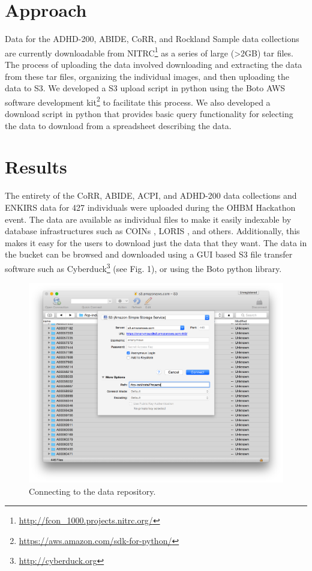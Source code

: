 \documentclass[twocolumn]{bmcart}%
\begin{document}
\section{Approach}\label{approach}

Data for the ADHD-200, ABIDE, CoRR, and Rockland Sample data collections
are currently downloadable from
NITRC\footnote{\url{http://fcon_1000.projects.nitrc.org/}} as a series
of large (\textgreater{}2GB) tar files. The process of uploading the
data involved downloading and extracting the data from these tar files,
organizing the individual images, and then uploading the data to S3. We
developed a S3 upload script in python using the Boto AWS software
development kit\footnote{\url{https://aws.amazon.com/sdk-for-python/}}
to facilitate this process. We also developed a download script in
python that provides basic query functionality for selecting the data to
download from a spreadsheet describing the data.

\section{Results}\label{results}

The entirety of the CoRR, ABIDE, ACPI, and ADHD-200 data collections and
ENKIRS data for 427 individuals were uploaded during the OHBM Hackathon
event. The data are available as individual files to make it easily
indexable by database infrastructures such as COINs \cite{landis2016},
LORIS \cite{Das2011}, and others. Additionally, this makes it easy for
the users to download just the data that they want. The data in the
bucket can be browsed and downloaded using a GUI based S3 file transfer
software such as Cyberduck\footnote{\url{http://cyberduck.org}} (see
Fig. 1), or using the Boto python library.

\begin{figure}[h!]
  \includegraphics[width=.47\textwidth]{cyberduck_screenshot.png}
  \caption{\label{centfig} Connecting to the data repository.}
\end{figure}
\end{document}
